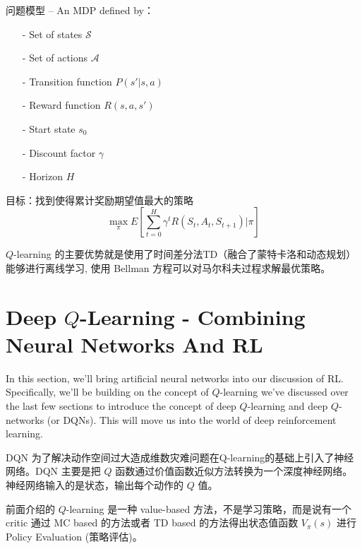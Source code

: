 问题模型 -- An MDP defined by：
\begin{itemize}
\setlength{\parskip}{0pt}
\item[-]
Set of states $\mathcal{S}$

\item[-]
Set of actions $\mathcal{A}$

\item[-]
Transition function $P(s'|s, a)$

\item[-]
Reward function $R(s,a,s')$

\item[-]
Start state $s_0$

\item[-]
Discount factor $\gamma$

\item[-]
Horizon $H$

\end{itemize}


目标：找到使得累计奖励期望值最大的策略
$$
\max_\pi E\left[ \sum_{t=0}^H \gamma^t R(S_t, A_t, S_{t+1}) | \pi \right]
$$

$Q$-learning 的主要优势就是使用了时间差分法TD（融合了蒙特卡洛和动态规划）能够进行离线学习, 
使用 Bellman 方程可以对马尔科夫过程求解最优策略。


%
\section{Deep $Q$-Learning - Combining Neural Networks And RL}
%


In this section, we'll bring artificial neural networks into our discussion of RL. 
Specifically, we'll be building on the concept of $Q$-learning we've discussed over 
the last few sections to introduce the concept of deep $Q$-learning and deep $Q$-networks 
(or DQNs). This will move us into the world of deep reinforcement learning.

DQN 为了解决动作空间过大造成维数灾难问题在Q-learning的基础上引入了神经网络。DQN 主要是把 $Q$ 
函数通过价值函数近似方法转换为一个深度神经网络。神经网络输入的是状态，输出每个动作的 $Q$ 值。

前面介绍的 $Q$-learning 是一种 value-based 方法，不是学习策略，而是说有一个 critic 通过 
MC based 的方法或者 TD based 的方法得出状态值函数 $V_\pi(s)$ 进行 Policy Evaluation 
(策略评估)。


